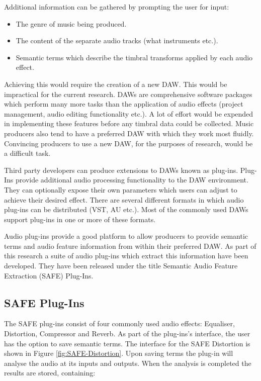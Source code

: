 		Additional information can be gathered by prompting the user for input:

		\begin{itemize}
			\item The genre of music being produced.
			\item The content of the separate audio tracks (what instruments etc.).
			\item Semantic terms which describe the timbral transforms applied by each audio
			      effect.
		\end{itemize}

		Achieving this would require the creation of a new DAW. This would be impractical for the current research.
		DAWs are comprehensive software packages which perform many more tasks than the application of audio
		effects (project management, audio editing functionality etc.). A lot of effort would be expended in
		implementing these features before any timbral data could be collected. Music producers also tend to have
		a preferred DAW with which they work most fluidly. Convincing producers to use a new DAW, for the purposes
		of research, would be a difficult task.

		Third party developers can produce extensions to DAWs known as plug-ins. Plug-Ins provide additional audio
		processing functionality to the DAW environment. They can optionally expose their own parameters which
		users can adjust to achieve their desired effect. There are several different formats in which audio
		plug-ins can be distributed (VST, AU etc.). Most of the commonly used DAWs support plug-ins in one or more
		of these formats.

		Audio plug-ins provide a good platform to allow producers to provide semantic terms and audio feature
		information from within their preferred DAW. As part of this research a suite of audio plug-ins which
		extract this information have been developed. They have been released under the title Semantic Audio
		Feature Extraction (SAFE) Plug-Ins.

	\subsection{SAFE Plug-Ins}
	\label{sec:TimbreEvaluation-DAWBasedTimbreEvaluation-SAFE}
		The SAFE plug-ins consist of four commonly used audio effects: Equaliser, Distortion, Compressor and
		Reverb. As part of the plug-ins's interface, the user has the option to save semantic terms. The interface
		for the SAFE Distortion is shown in Figure \ref{fig:SAFE-Distortion}. Upon saving terms the plug-in will
		analyse the audio at its inputs and outputs. When the analysis is completed the results are stored,
		containing:

